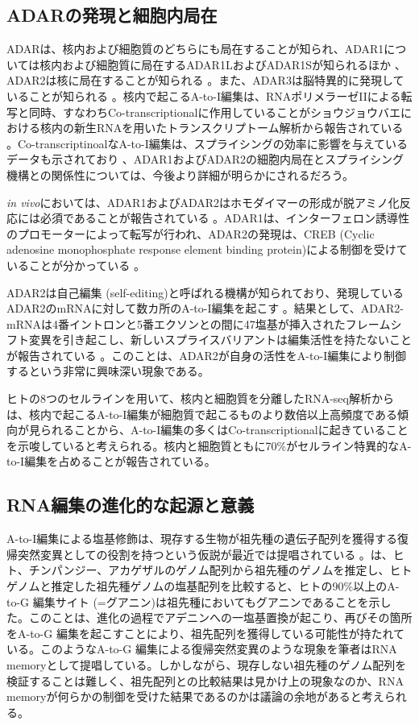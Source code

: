 \subsection{ADARの発現と細胞内局在}
ADARは、核内および細胞質のどちらにも局在することが知られ、ADAR1については核内および細胞質に局在するADAR1LおよびADAR1Sが知られるほか \citep{PatSam9510}、ADAR2は核に局在することが知られる \citep{DesKeeLaf0305}。また、ADAR3は脳特異的に発現していることが知られる \citep{MelMaaHer9612}。核内で起こるA-to-I編集は、RNAポリメラーゼIIによる転写と同時、すなわちCo-transcriptionalに作用していることがショウジョウバエにおける核内の新生RNAを用いたトランスクリプトーム解析から報告されている \citep{Rodriguez:2012aa}。Co-transcriptinoalなA-to-I編集は、スプライシングの効率に影響を与えているデータも示されており \citep{Laurencikiene:2006aa}、ADAR1およびADAR2の細胞内局在とスプライシング機構との関係性については、今後より詳細が明らかにされるだろう。
\par
\textit{in vivo}においては、ADAR1およびADAR2はホモダイマーの形成が脱アミノ化反応には必須であることが報告されている \citep{GalKeeRin0307}。ADAR1は、インターフェロン誘導性のプロモーターによって転写が行われ、ADAR2の発現は、CREB (Cyclic adenosine monophosphate response element binding protein)による制御を受けていることが分かっている \citep{PatSam9510}。
\par
ADAR2は自己編集 (self-editing)と呼ばれる機構が知られており、発現しているADAR2のmRNAに対して数カ所のA-to-I編集を起こす \citep{GanZhaYan0611}。結果として、ADAR2-mRNAは4番イントロンと5番エクソンとの間に47塩基が挿入されたフレームシフト変異を引き起こし、新しいスプライスバリアントは編集活性を持たないことが報告されている \citep{HanTohMat0808}。このことは、ADAR2が自身の活性をA-to-I編集により制御するという非常に興味深い現象である。
\par
ヒトの8つのセルラインを用いて、核内と細胞質を分離したRNA-seq解析からは、核内で起こるA-to-I編集が細胞質で起こるものより数倍以上高頻度である傾向が見られることから、A-to-I編集の多くはCo-transcriptionalに起きていることを示唆していると考えられる。核内と細胞質ともに70\%がセルライン特異的なA-to-I編集を占めることが報告されている。

\subsection{RNA編集の進化的な起源と意義}
A-to-I編集による塩基修飾は、現存する生物が祖先種の遺伝子配列を獲得する復帰突然変異としての役割を持つという仮説が最近では提唱されている \citep{Che1307, Pinto:2014aa}。\cite{Che1307}は、ヒト、チンパンジー、アカゲザルのゲノム配列から祖先種のゲノムを推定し、ヒトゲノムと推定した祖先種ゲノムの塩基配列を比較すると、ヒトの90\%以上のA-to-G 編集サイト (=グアニン)は祖先種においてもグアニンであることを示した。このことは、進化の過程でアデニンへの一塩基置換が起こり、再びその箇所をA-to-G 編集を起こすことにより、祖先配列を獲得している可能性が持たれている。このようなA-to-G 編集による復帰突然変異のような現象を筆者はRNA memoryとして提唱している。しかしながら、現存しない祖先種のゲノム配列を検証することは難しく、祖先配列との比較結果は見かけ上の現象なのか、RNA memoryが何らかの制御を受けた結果であるのかは議論の余地があると考えられる。

